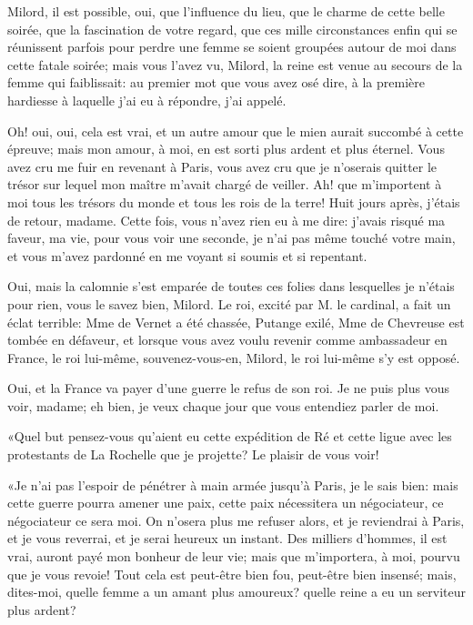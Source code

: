 \speak  Milord, il est possible, oui, que l'influence du lieu, que le charme de cette belle soirée, que la fascination de votre regard, que ces mille circonstances enfin qui se réunissent parfois pour perdre une femme se soient groupées autour de moi dans cette fatale soirée; mais vous l'avez vu, Milord, la reine est venue au secours de la femme qui faiblissait: au premier mot que vous avez osé dire, à la première hardiesse à laquelle j'ai eu à répondre, j'ai appelé. 

\speak  Oh! oui, oui, cela est vrai, et un autre amour que le mien aurait succombé à cette épreuve; mais mon amour, à moi, en est sorti plus ardent et plus éternel. Vous avez cru me fuir en revenant à Paris, vous avez cru que je n'oserais quitter le trésor sur lequel mon maître m'avait chargé de veiller. Ah! que m'importent à moi tous les trésors du monde et tous les rois de la terre! Huit jours après, j'étais de retour, madame. Cette fois, vous n'avez rien eu à me dire: j'avais risqué ma faveur, ma vie, pour vous voir une seconde, je n'ai pas même touché votre main, et vous m'avez pardonné en me voyant si soumis et si repentant. 

\speak  Oui, mais la calomnie s'est emparée de toutes ces folies dans lesquelles je n'étais pour rien, vous le savez bien, Milord. Le roi, excité par M. le cardinal, a fait un éclat terrible: Mme de Vernet a été chassée, Putange exilé, Mme de Chevreuse est tombée en défaveur, et lorsque vous avez voulu revenir comme ambassadeur en France, le roi lui-même, souvenez-vous-en, Milord, le roi lui-même s'y est opposé. 

\speak  Oui, et la France va payer d'une guerre le refus de son roi. Je ne puis plus vous voir, madame; eh bien, je veux chaque jour que vous entendiez parler de moi. 

«Quel but pensez-vous qu'aient eu cette expédition de Ré et cette ligue avec les protestants de La Rochelle que je projette? Le plaisir de vous voir! 

«Je n'ai pas l'espoir de pénétrer à main armée jusqu'à Paris, je le sais bien: mais cette guerre pourra amener une paix, cette paix nécessitera un négociateur, ce négociateur ce sera moi. On n'osera plus me refuser alors, et je reviendrai à Paris, et je vous reverrai, et je serai heureux un instant. Des milliers d'hommes, il est vrai, auront payé mon bonheur de leur vie; mais que m'importera, à moi, pourvu que je vous revoie! Tout cela est peut-être bien fou, peut-être bien insensé; mais, dites-moi, quelle femme a un amant plus amoureux? quelle reine a eu un serviteur plus ardent? 

